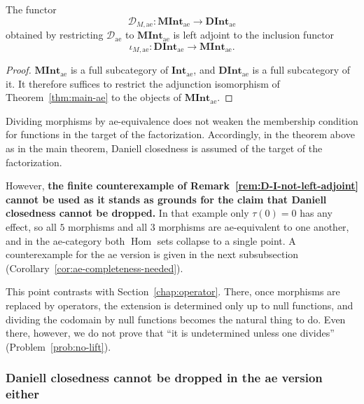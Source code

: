 \begin{corollary}
  The functor
  \[
    \mathcal{D}_{M,\mathrm{ae}}:
    \mathbf{MInt}_{\mathrm{ae}}
    \to
    \mathbf{DInt}_{\mathrm{ae}}
  \]
  obtained by restricting $\mathcal{D}_{\mathrm{ae}}$ to
  $\mathbf{MInt}_{\mathrm{ae}}$ is left adjoint to the inclusion functor
  \[
    \iota_{M,\mathrm{ae}}:
    \mathbf{DInt}_{\mathrm{ae}}
    \to
    \mathbf{MInt}_{\mathrm{ae}} .
  \]
\end{corollary}
\begin{proof}
  $\mathbf{MInt}_{\mathrm{ae}}$ is a full subcategory of
  $\mathbf{Int}_{\mathrm{ae}}$, and $\mathbf{DInt}_{\mathrm{ae}}$ is a full
  subcategory of it.
  It therefore suffices to restrict the adjunction isomorphism of
  Theorem~\ref{thm:main-ae} to the objects of
  $\mathbf{MInt}_{\mathrm{ae}}$.
\end{proof}

\begin{remark}\label{rem:ae-mct-counterexample-fails}
  Dividing morphisms by ae-equivalence does not weaken the membership condition
  for functions in the target of the factorization.
  Accordingly, in the theorem above as in the main theorem, Daniell closedness is
  assumed of the target of the factorization.

  However, \textbf{the finite counterexample of
  Remark~\ref{rem:D-I-not-left-adjoint} cannot be used as it stands as grounds
  for the claim that Daniell closedness cannot be dropped.}
  In that example only $\tau(0)=0$ has any effect, so all $5$ morphisms and all
  $3$ morphisms are ae-equivalent to one another, and in the ae-category both
  $\operatorname{Hom}$ sets collapse to a single point.
  A counterexample for the ae version is given in the next subsubsection
  (Corollary~\ref{cor:ae-completeness-needed}).

  This point contrasts with Section~\ref{chap:operator}.
  There, once morphisms are replaced by operators, the extension is determined
  only up to null functions, and dividing the codomain by null functions becomes
  the natural thing to do.
  Even there, however, we do not prove that ``it is undetermined unless one
  divides'' (Problem~\ref{prob:no-lift}).
\end{remark}

\subsubsection{Daniell closedness cannot be dropped in the ae version either}

